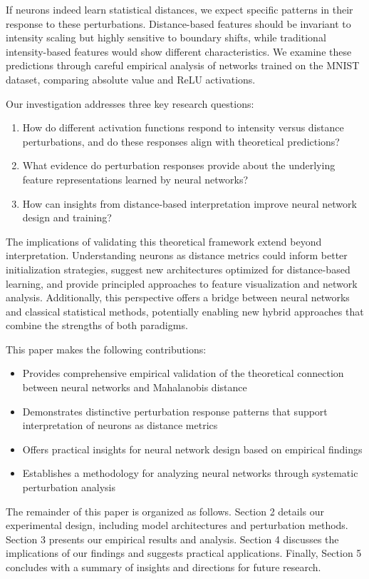 If neurons indeed learn statistical distances, we expect specific patterns in their response to these perturbations. Distance-based features should be invariant to intensity scaling but highly sensitive to boundary shifts, while traditional intensity-based features would show different characteristics. We examine these predictions through careful empirical analysis of networks trained on the MNIST dataset, comparing absolute value and ReLU activations.

Our investigation addresses three key research questions:
\begin{enumerate}
    \item How do different activation functions respond to intensity versus distance perturbations, and do these responses align with theoretical predictions?
    \item What evidence do perturbation responses provide about the underlying feature representations learned by neural networks?
    \item How can insights from distance-based interpretation improve neural network design and training?
\end{enumerate}

The implications of validating this theoretical framework extend beyond interpretation. Understanding neurons as distance metrics could inform better initialization strategies, suggest new architectures optimized for distance-based learning, and provide principled approaches to feature visualization and network analysis. Additionally, this perspective offers a bridge between neural networks and classical statistical methods, potentially enabling new hybrid approaches that combine the strengths of both paradigms.

This paper makes the following contributions:
\begin{itemize}
    \item Provides comprehensive empirical validation of the theoretical connection between neural networks and Mahalanobis distance
    \item Demonstrates distinctive perturbation response patterns that support interpretation of neurons as distance metrics
    \item Offers practical insights for neural network design based on empirical findings
    \item Establishes a methodology for analyzing neural networks through systematic perturbation analysis
\end{itemize}

The remainder of this paper is organized as follows. Section 2 details our experimental design, including model architectures and perturbation methods. Section 3 presents our empirical results and analysis. Section 4 discusses the implications of our findings and suggests practical applications. Finally, Section 5 concludes with a summary of insights and directions for future research.